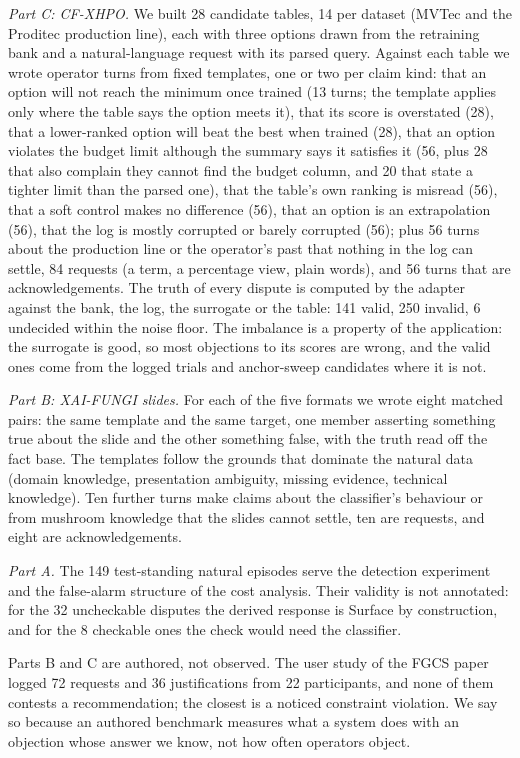 \documentclass[preprint,12pt,3p,times]{elsarticle}
\begin{document}
\emph{Part C: CF-XHPO.} We built 28 candidate tables, 14 per dataset (MVTec and the Proditec production line), each with three options drawn from the retraining bank and a natural-language request with its parsed query. Against each table we wrote operator turns from fixed templates, one or two per claim kind: that an option will not reach the minimum once trained (13 turns; the template applies only where the table says the option meets it), that its score is overstated (28), that a lower-ranked option will beat the best when trained (28), that an option violates the budget limit although the summary says it satisfies it (56, plus 28 that also complain they cannot find the budget column, and 20 that state a tighter limit than the parsed one), that the table's own ranking is misread (56), that a soft control makes no difference (56), that an option is an extrapolation (56), that the log is mostly corrupted or barely corrupted (56); plus 56 turns about the production line or the operator's past that nothing in the log can settle, 84 requests (a term, a percentage view, plain words), and 56 turns that are acknowledgements. The truth of every dispute is computed by the adapter against the bank, the log, the surrogate or the table: 141 valid, 250 invalid, 6 undecided within the noise floor. The imbalance is a property of the application: the surrogate is good, so most objections to its scores are wrong, and the valid ones come from the logged trials and anchor-sweep candidates where it is not.

\emph{Part B: XAI-FUNGI slides.} For each of the five formats we wrote eight matched pairs: the same template and the same target, one member asserting something true about the slide and the other something false, with the truth read off the fact base. The templates follow the grounds that dominate the natural data (domain knowledge, presentation ambiguity, missing evidence, technical knowledge). Ten further turns make claims about the classifier's behaviour or from mushroom knowledge that the slides cannot settle, ten are requests, and eight are acknowledgements.

\emph{Part A.} The 149 test-standing natural episodes serve the detection experiment and the false-alarm structure of the cost analysis. Their validity is not annotated: for the 32 uncheckable disputes the derived response is Surface by construction, and for the 8 checkable ones the check would need the classifier.

Parts B and C are authored, not observed. The user study of the FGCS paper logged 72 requests and 36 justifications from 22 participants, and none of them contests a recommendation; the closest is a noticed constraint violation. We say so because an authored benchmark measures what a system does with an objection whose answer we know, not how often operators object.
\end{document}
